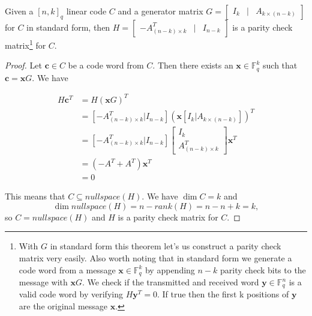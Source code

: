 \begin{thm}\label{generatorParityCheckRel}
Given a $[n, k]_q$ linear code $C$ and a generator matrix $
G = \left[\begin{smallmatrix}
I_k & | & A_{k \times (n - k)}
\end{smallmatrix}\right]
$ for $C$ in standard form, then $
H = \left[\begin{smallmatrix}
-A^T_{(n - k) \times k} & | & I_{n - k}
\end{smallmatrix}\right]
$ is a parity check matrix\footnote{With $G$ in standard form this theorem let's us construct a parity check matrix very easily. Also worth noting that in standard form we generate a code word from a message $\bm{x} \in \mathbb{F}_q^k$ by appending $n - k$ parity check bits to the message with $\bm{x} G$. We check if the transmitted and received word $\bm{y} \in \mathbb{F}_q^n$ is a valid code word by verifying $H \bm{y}^T = 0$. If true then the first k positions of $\bm{y}$ are the original message $\bm{x}$.} for $C$.
\end{thm}

\begin{proof}

Let $\bm{c} \in C$ be a code word from $C$. Then there exists an $\bm{x} \in \mathbb{F}_q^k$ such that $\bm{c} = \bm{x} G$.
We have

\begin{align*}
 H \bm{c}^T &= H (\bm{x} G)^T \\
        &= \left[ -A^T_{(n - k) \times k} | I_{n - k} \right] \left(\bm{x} \left[ I_k | A_{k \times (n - k)} \right]\right)^T \\
        &=  \left[ -A^T_{(n - k) \times k} | I_{n - k} \right] \left[ \begin{array}{c}
                                                                           I_k \\ \hline
                                                                           A^T_{(n - k) \times k}
                                                                       \end{array}  \right] \bm{x}^T \\
        &= (-A^T + A^T) \bm{x}^T \\
        &= 0
\end{align*}

This means that $C \subseteq nullspace(H)$. We have $\dim C = k$ and 
$$
\dim nullspace(H) = n - rank(H) = n - n + k = k,
$$
so $C = nullspace(H)$ and $H$ is a parity check matrix for $C$.

\end{proof}

